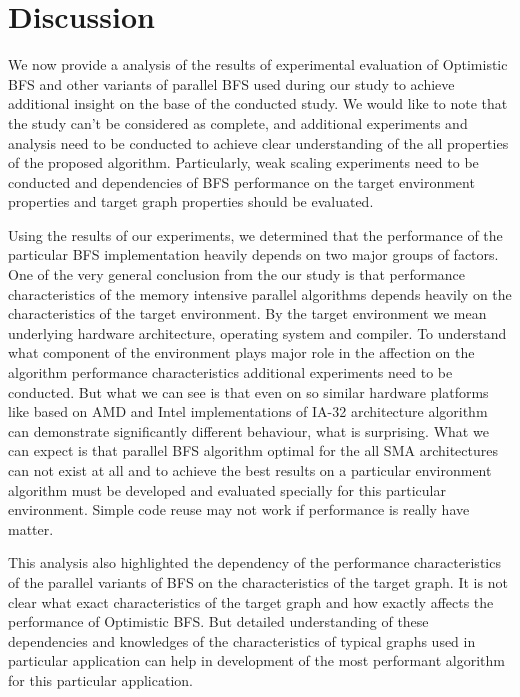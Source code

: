 \documentclass[letterpaper]{article}
\begin{document}
	\section{Discussion}\label{sec:disc} %
		We now provide a analysis of the results of experimental evaluation of Optimistic BFS and other variants of parallel BFS used during our study to achieve additional insight on the base of the conducted study.
		We would like to note that the study can't be considered as complete, and additional experiments and analysis need to be conducted to achieve clear understanding of the all properties of the proposed algorithm.  
		Particularly, weak scaling experiments need to be conducted and dependencies of BFS performance on the target environment properties and target graph properties should be evaluated. 
		
		Using the results of our experiments, we determined that the performance of the particular BFS implementation heavily depends on two major groups  of factors.
		One of the very general conclusion from the our study is that performance characteristics of the memory intensive parallel algorithms depends heavily on the characteristics of the target environment.   
		By the target environment we mean underlying hardware architecture, operating system and compiler.
		To understand what component of the environment plays major role in the affection on the algorithm performance characteristics additional experiments need to be conducted.
		But what we can see is that even on so similar hardware platforms like based on AMD and Intel implementations of IA-32 architecture algorithm can demonstrate significantly different behaviour, what is surprising.
		What we can expect is that parallel BFS algorithm optimal for the all SMA architectures can not exist at all and to achieve the best results on a particular environment algorithm must be developed and evaluated specially for this particular environment.
		Simple code reuse may not work if performance is really have matter.
		
		This analysis also highlighted the dependency of the performance characteristics of the parallel variants of BFS on the characteristics of the target graph.
		It is not clear what exact characteristics of the target graph and how exactly affects the performance of Optimistic BFS. 
		But detailed understanding of these dependencies and knowledges of the characteristics of typical graphs used in particular application can help in development of the most performant algorithm for this particular application.
		
\end{document}
